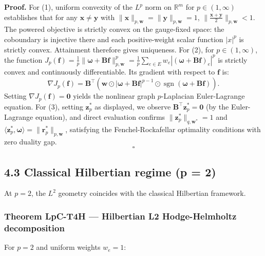 \documentclass[
]{article}
\begin{document}
\textbf{Proof.} For (1), uniform convexity of the \(L^p\) norm on \(\mathbb{R}^m\) for \(p \in (1, \infty)\) establishes that for any \(\mathbf{x} \ne \mathbf{y}\) with \(\|\mathbf{x}\|_{p,\mathbf{w}} = \|\mathbf{y}\|_{p,\mathbf{w}} = 1\), \(\|\frac{\mathbf{x}+\mathbf{y}}{2}\|_{p,\mathbf{w}} < 1\).
The powered objective is strictly convex on the gauge-fixed space: the coboundary is injective there and each positive-weight scalar function \(|x|^p\) is strictly convex. Attainment therefore gives uniqueness.
For (2), for \(p \in (1, \infty)\), the function \(J_p(\mathbf{f}) = \frac{1}{p} \|\boldsymbol{\omega} + \mathbf{B}\mathbf{f}\|_{p,\mathbf{w}}^p = \frac{1}{p} \sum_{e \in E} w_e |(\boldsymbol{\omega} + \mathbf{B}\mathbf{f})_e|^p\) is strictly convex and continuously differentiable.
Its gradient with respect to \(\mathbf{f}\) is:
\[\nabla J_p(\mathbf{f}) = \mathbf{B}^\top \left( \mathbf{w} \odot |\boldsymbol{\omega} + \mathbf{B}\mathbf{f}|^{p-1} \odot \operatorname{sgn}(\boldsymbol{\omega} + \mathbf{B}\mathbf{f}) \right).\]
Setting \(\nabla J_p(\mathbf{f}) = \mathbf{0}\) yields the nonlinear graph \(p\)-Laplacian Euler-Lagrange equation.
For (3), setting \(\mathbf{z}_p^*\) as displayed, we observe \(\mathbf{B}^\top \mathbf{z}_p^* = \mathbf{0}\) (by the Euler-Lagrange equation), and direct evaluation confirms \(\|\mathbf{z}_p^*\|_{q, \mathbf{w}^*} = 1\) and \(\langle \mathbf{z}_p^*, \boldsymbol{\omega} \rangle = \|\mathbf{r}_p^*\|_{p, \mathbf{w}}\), satisfying the Fenchel-Rockafellar optimality conditions with zero duality gap. \[\square\]

\subsection{4.3 Classical Hilbertian regime (p = 2)}\label{classical-hilbertian-regime-p-2}

At \(p = 2\), the \(L^2\) geometry coincides with the classical Hilbertian framework.

\subsubsection{Theorem LpC-T4H --- Hilbertian L2 Hodge-Helmholtz decomposition}\label{theorem-lpc-t4h-hilbertian-l2-hodge-helmholtz-decomposition}

For \(p = 2\) and uniform weights \(w_e = 1\):
\end{document}
